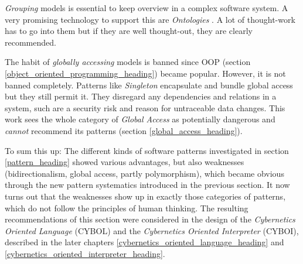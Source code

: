 \emph{Grouping} models is essential to keep overview in a complex software
system. A very promising technology to support this are \emph{Ontologies}
\cite{hellerkunze}. A lot of thought-work has to go into them but if they are
well thought-out, they are clearly recommended.

The habit of \emph{globally accessing} models is banned since OOP (section
\ref{object_oriented_programming_heading}) became popular. However, it is not
banned completely. Patterns like \emph{Singleton} encapsulate and bundle global
access but they still permit it. They disregard any dependencies and relations
in a system, such are a security risk and reason for untraceable data changes.
This work sees the whole category of \emph{Global Access} as potentially
dangerous and \emph{cannot} recommend its patterns (section
\ref{global_access_heading}).

To sum this up: The different kinds of software patterns investigated in
section \ref{pattern_heading} showed various advantages, but also weaknesses
(bidirectionalism, global access, partly polymorphism), which became obvious
through the new pattern systematics introduced in the previous section. It now
turns out that the weaknesses show up in exactly those categories of patterns,
which do not follow the principles of human thinking. The resulting
recommendations of this section were considered in the design of the
\emph{Cybernetics Oriented Language} (CYBOL) and the
\emph{Cybernetics Oriented Interpreter} (CYBOI), described in the later
chapters \ref{cybernetics_oriented_language_heading} and
\ref{cybernetics_oriented_interpreter_heading}.
